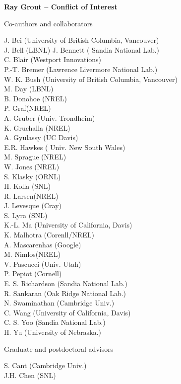 \documentclass[11pt]{article}
\begin{document}
\begin{center}
{\large{\bf Ray Grout -- Conflict of Interest}} \\
\end{center}

\vspace{.2 true in}


\vspace{.2in}
Co-authors and collaborators

\vspace{.1in}
J. Bei (University of British Columbia, Vancouver) \\
J. Bell (LBNL)
J. Bennett ( Sandia National Lab.) \\
C. Blair (Westport Innovations) \\
P.-T. Bremer (Lawrence Livermore National Lab.) \\
W. K. Bush (University of British Columbia, Vancouver) \\
M. Day (LBNL) \\
B. Donohoe (NREL) \\
P. Graf(NREL) \\
A. Gruber (Univ. Trondheim) \\
K. Gruchalla (NREL) \\
A. Gyulassy (UC Davis) \\
E.R. Hawkes ( Univ. New South Wales) \\
M. Sprague (NREL) \\
W. Jones (NREL)  \\
S. Klasky (ORNL) \\
H. Kolla (SNL) \\
R. Larsen(NREL) \\
J. Levesque (Cray) \\
S. Lyra (SNL) \\
K.-L. Ma (University of California, Davis) \\
K. Malhotra (Corenll/NREL) \\
A. Mascarenhas (Google) \\
M. Nimlos(NREL) \\
V. Pascucci (Univ. Utah) \\
P. Pepiot (Cornell) \\
E. S. Richardson (Sandia National Lab.) \\
R. Sankaran (Oak Ridge National Lab.) \\
N. Swaminathan (Cambridge Univ.) \\
C. Wang (University of California, Davis) \\
C.  S. Yoo (Sandia National Lab.) \\
H. Yu (University of Nebraska.) 

\vspace{.2in}
Graduate and postdoctoral advisors

\vspace{.1in}
S. Cant (Cambridge Univ.) \\
J.H. Chen (SNL)
\end{document}
